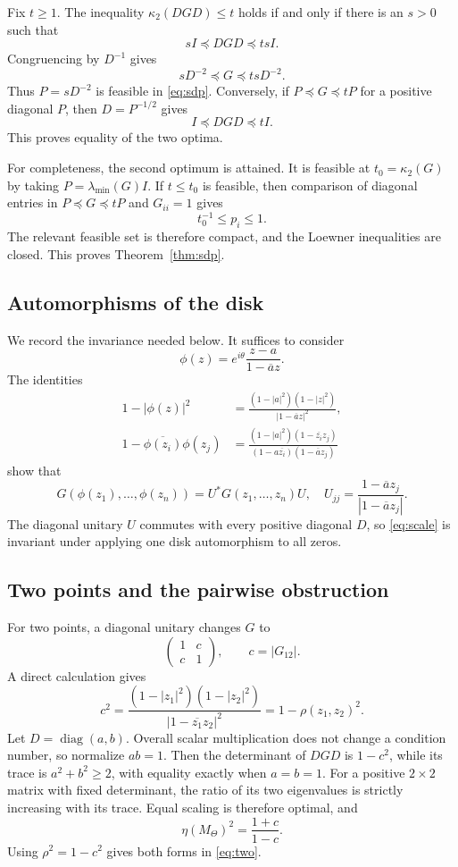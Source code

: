 \documentclass[11pt]{article}
\newcommand{\diag}{\operatorname{diag}}
\newcommand{\cond}{\kappa_2}
\begin{document}
Fix $t\geq1$.  The inequality $\cond(DGD)\leq t$ holds if and only if there is
an $s>0$ such that
\[
 sI\preceq DGD\preceq tsI.
\]
Congruencing by $D^{-1}$ gives
\[
 sD^{-2}\preceq G\preceq tsD^{-2}.
\]
Thus $P=sD^{-2}$ is feasible in \eqref{eq:sdp}.  Conversely, if
$P\preceq G\preceq tP$ for a positive diagonal $P$, then
$D=P^{-1/2}$ gives
\[
 I\preceq DGD\preceq tI.
\]
This proves equality of the two optima.

For completeness, the second optimum is attained.  It is feasible at
$t_0=\cond(G)$ by taking $P=\lambda_{\min}(G)I$.  If $t\leq t_0$ is feasible,
then comparison of diagonal entries in $P\preceq G\preceq tP$ and $G_{ii}=1$
gives
\[
 t_0^{-1}\leq p_i\leq1.
\]
The relevant feasible set is therefore compact, and the Loewner inequalities
are closed.  This proves Theorem~\ref{thm:sdp}.

\subsection{Automorphisms of the disk}

We record the invariance needed below.  It suffices to consider
\[
 \phi(z)=e^{i\theta}\frac{z-a}{1-\overline az}.
\]
The identities
\begin{align*}
 1-|\phi(z)|^2&=\frac{(1-|a|^2)(1-|z|^2)}{|1-\overline az|^2},\\
 1-\overline{\phi(z_i)}\phi(z_j)
 &=\frac{(1-|a|^2)(1-\overline{z_i}z_j)}
 {(1-a\overline{z_i})(1-\overline az_j)}
\end{align*}
show that
\begin{equation}\label{eq:mobius}
 G(\phi(z_1),\dots,\phi(z_n))=U^*G(z_1,\dots,z_n)U,
 \quad
 U_{jj}=\frac{1-\overline az_j}{|1-\overline az_j|}.
\end{equation}
The diagonal unitary $U$ commutes with every positive diagonal $D$, so
\eqref{eq:scale} is invariant under applying one disk automorphism to all
zeros.

\subsection{Two points and the pairwise obstruction}

For two points, a diagonal unitary changes $G$ to
\[
 \begin{pmatrix}1&c\\c&1\end{pmatrix},\qquad
 c=|G_{12}|.
\]
A direct calculation gives
\begin{equation}\label{eq:c-rho}
 c^2=\frac{(1-|z_1|^2)(1-|z_2|^2)}
 {|1-\overline{z_1}z_2|^2}=1-\rho(z_1,z_2)^2.
\end{equation}
Let $D=\diag(a,b)$.  Overall scalar multiplication does not change a condition
number, so normalize $ab=1$.  Then the determinant of $DGD$ is $1-c^2$, while
its trace is $a^2+b^2\geq2$, with equality exactly when $a=b=1$.  For a
positive $2\times2$ matrix with fixed determinant, the ratio of its two
eigenvalues is strictly increasing with its trace.  Equal scaling is therefore
optimal, and
\[
 \eta(M_\Theta)^2=\frac{1+c}{1-c}.
\]
Using $\rho^2=1-c^2$ gives both forms in \eqref{eq:two}.
\end{document}
